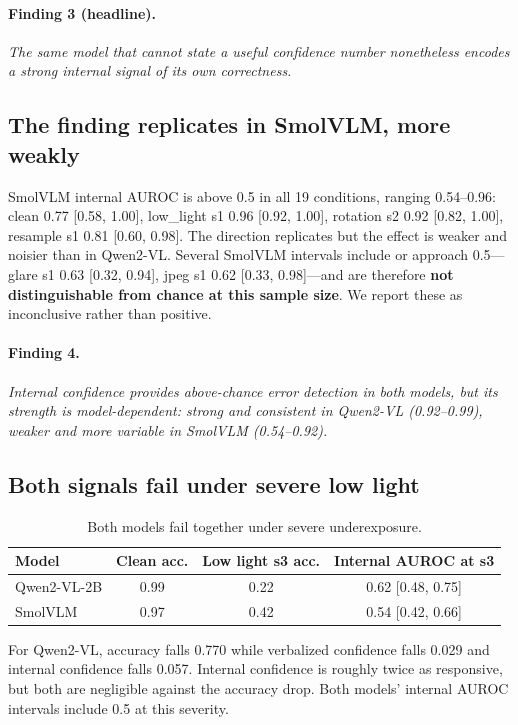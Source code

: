 \documentclass[11pt]{article}
\begin{document}
\paragraph{Finding 3 (headline).} \emph{The same model that cannot state a
useful confidence number nonetheless encodes a strong internal signal of its own
correctness.}

\subsection{The finding replicates in SmolVLM, more weakly}

SmolVLM internal AUROC is above 0.5 in all 19 conditions, ranging 0.54--0.96:
clean 0.77 [0.58, 1.00], low\_light s1 0.96 [0.92, 1.00], rotation s2 0.92
[0.82, 1.00], resample s1 0.81 [0.60, 0.98]. The direction replicates but the
effect is weaker and noisier than in Qwen2-VL. Several SmolVLM intervals include
or approach 0.5---glare s1 0.63 [0.32, 0.94], jpeg s1 0.62 [0.33, 0.98]---and
are therefore \textbf{not distinguishable from chance at this sample size}. We
report these as inconclusive rather than positive.

\paragraph{Finding 4.} \emph{Internal confidence provides above-chance error
detection in both models, but its strength is model-dependent: strong and
consistent in Qwen2-VL (0.92--0.99), weaker and more variable in SmolVLM
(0.54--0.92).}

\subsection{Both signals fail under severe low light}

\begin{table}[h]
\centering
\caption{Both models fail together under severe underexposure.}
\label{tab:lowlight}
\begin{tabular}{lccc}
\toprule
Model & Clean acc. & Low light s3 acc. & Internal AUROC at s3 \\
\midrule
Qwen2-VL-2B & 0.99 & 0.22 & 0.62 [0.48, 0.75] \\
SmolVLM     & 0.97 & 0.42 & 0.54 [0.42, 0.66] \\
\bottomrule
\end{tabular}
\end{table}

For Qwen2-VL, accuracy falls 0.770 while verbalized confidence falls 0.029 and
internal confidence falls 0.057. Internal confidence is roughly twice as
responsive, but both are negligible against the accuracy drop. Both models'
internal AUROC intervals include 0.5 at this severity.
\end{document}
